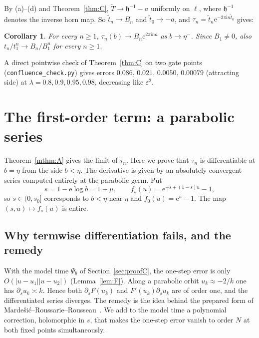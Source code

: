 \documentclass[11pt]{amsart}
\newtheorem{corollary}[theorem]{Corollary}
\theoremstyle{definition}
\newcommand{\eee}{\mathrm{e}}
\newcommand{\ii}{\mathrm{i}}
\begin{document}
By (a)--(d) and Theorem~\ref{thm:C}, $\tilde T\to \mathfrak h^{-1}-a$ uniformly on
$\ell$, where $\mathfrak h^{-1}$ denotes the inverse horn map.
So $\tilde t_n\to B_n$ and $\tilde t_0\to-a$, and
$\tau_n=\tilde t_n\eee^{-2\pi\ii n\tilde t_0}$ gives:

\begin{corollary}\label{cor:tauconv}
For every $n\ge1$, $\tau_n(b)\to B_n\eee^{2\pi\ii na}$ as $b\to\eta^-$.
Since $B_1\ne0$, also $t_n/t_1^n\to B_n/B_1^n$ for every $n\ge1$.
\end{corollary}

\noindent
A direct pointwise check of Theorem~\ref{thm:C} on two gate points
(\texttt{confluence\_check.py}) gives errors
$0.086,\,0.021,\,0.0050,\,0.00079$ (attracting side) at
$\lambda=0.8,0.9,0.95,0.98$, decreasing like $\varepsilon^2$.

\section{The first-order term: a parabolic series}\label{sec:first}

Theorem~\ref{mthm:A} gives the limit of $\tau_n$.  Here we prove that $\tau_n$ is
differentiable at $b=\eta$ from the side $b<\eta$.  The derivative is given by an
absolutely convergent series computed entirely at the parabolic germ.  Put
\[
 s=1-\eee\log b=1-\mu,\qquad f_s(u)=\eee^{-s+(1-s)u}-1 ,
\]
so $s\in(0,s_0]$ corresponds to $b<\eta$ near $\eta$ and $f_0(u)=\eee^u-1$.  The
map $(s,u)\mapsto f_s(u)$ is entire.

\subsection{Why termwise differentiation fails, and the remedy}
With the model time $\Psi_b$ of Section~\ref{sec:proofC}, the one-step error is
only $O(|u-u_1||u-u_2|)$ (Lemma~\ref{lem:F}).  Along a parabolic orbit
$u_k\approx-2/k$ one has $\partial_su_k\asymp k$.  Hence both $\partial_sF(u_k)$ and
$F'(u_k)\partial_su_k$ are of order one, and the differentiated series diverges.
The remedy is the idea behind the prepared form of
Marde\v{s}i\'c--Roussarie--Rousseau~\cite{MRR2004}.  We add to the model time a
polynomial correction, holomorphic in $s$, that makes the one-step error vanish
to order $N$ at both fixed points simultaneously.
\end{document}
